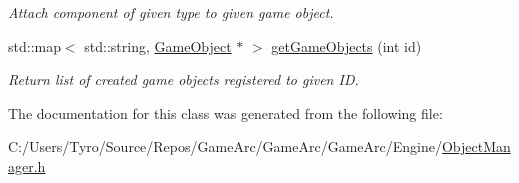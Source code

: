 \begin{DoxyCompactItemize}
\begin{DoxyCompactList}\small\item\em Attach component of given type to given game object. \end{DoxyCompactList}\item 
\mbox{\label{class_object_manager_ae3e3f513abd9674f2b455f161ad0fb6d}} 
std\+::map$<$ std\+::string, \mbox{\hyperlink{class_game_object}{Game\+Object}} $\ast$ $>$ \mbox{\hyperlink{class_object_manager_ae3e3f513abd9674f2b455f161ad0fb6d}{get\+Game\+Objects}} (int id)
\begin{DoxyCompactList}\small\item\em Return list of created game objects registered to given ID. \end{DoxyCompactList}\end{DoxyCompactItemize}


The documentation for this class was generated from the following file\+:\begin{DoxyCompactItemize}
\item 
C\+:/\+Users/\+Tyro/\+Source/\+Repos/\+Game\+Arc/\+Game\+Arc/\+Game\+Arc/\+Engine/\mbox{\hyperlink{_object_manager_8h}{Object\+Manager.\+h}}\end{DoxyCompactItemize}
